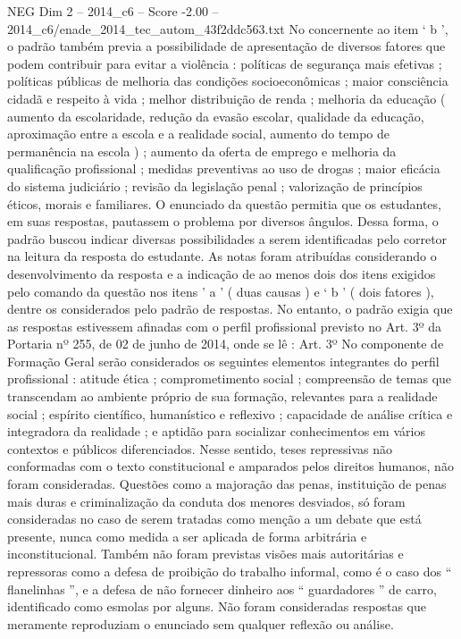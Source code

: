 \begin{textsample}{NEG Dim 2 – 2014\_c6 – Score -2.00 – 2014\_c6/enade\_2014\_tec\_autom\_43f2ddc563.txt}
No concernente ao item ‘ b ’, o padrão também previa a possibilidade de apresentação de diversos fatores que podem contribuir para evitar a violência : políticas de segurança mais efetivas ; políticas públicas de melhoria das condições socioeconômicas ; maior consciência cidadã e respeito à vida ; melhor distribuição de renda ; melhoria da educação ( aumento da escolaridade, redução da evasão escolar, qualidade da educação, aproximação entre a escola e a realidade social, aumento do tempo de permanência na escola ) ; aumento da oferta de emprego e melhoria da qualificação profissional ; medidas preventivas ao uso de drogas ; maior eficácia do sistema judiciário ; revisão da legislação penal ; valorização de princípios éticos, morais e familiares.
O enunciado da questão permitia que os estudantes, em suas respostas, pautassem o problema por diversos ângulos.
Dessa forma, o padrão buscou indicar diversas possibilidades a serem identificadas pelo corretor na leitura da resposta do estudante.
As notas foram atribuídas considerando o desenvolvimento da resposta e a indicação de ao menos dois dos itens exigidos pelo comando da questão nos itens ’ a ’ ( duas causas ) e ‘ b ’ ( dois fatores ), dentre os considerados pelo padrão de respostas.
No entanto, o padrão exigia que as respostas estivessem afinadas com o perfil profissional previsto no Art. 3º da Portaria nº 255, de 02 de junho de 2014, onde se lê : Art. 3º No componente de Formação Geral serão considerados os seguintes elementos integrantes do perfil profissional : atitude ética ; comprometimento social ; compreensão de temas que transcendam ao ambiente próprio de sua formação, relevantes para a realidade social ; espírito científico, humanístico e reflexivo ; capacidade de análise crítica e integradora da realidade ; e aptidão para socializar conhecimentos em vários contextos e públicos diferenciados.
Nesse sentido, teses repressivas não conformadas com o texto constitucional e amparados pelos direitos humanos, não foram consideradas.
Questões como a majoração das penas, instituição de penas mais duras e criminalização da conduta dos menores desviados, só foram consideradas no caso de serem tratadas como menção a um debate que está presente, nunca como medida a ser aplicada de forma arbitrária e inconstitucional.
Também não foram previstas visões mais autoritárias e repressoras como a defesa de proibição do trabalho informal, como é o caso dos “ flanelinhas ”, e a defesa de não fornecer dinheiro aos “ guardadores ” de carro, identificado como esmolas por alguns.
Não foram consideradas respostas que meramente reproduziam o enunciado sem qualquer reflexão ou análise.

\end{textsample}
